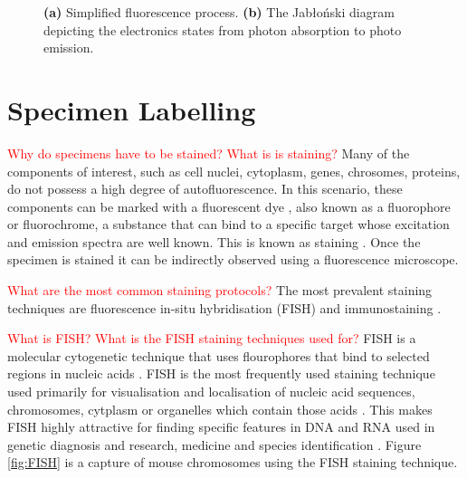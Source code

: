 \begin{figure}[!h]
	\centering
	\caption{\textbf{(a)} Simplified fluorescence process. \textbf{(b)} The Jab{\l}o{\'n}ski diagram depicting the electronics states from photon absorption to photo emission.}
	\label{fig:thinkoflabel}
\end{figure}


\section{Specimen Labelling}
\label{sec:SpecimenLabelling}

\textcolor{red}{Why do specimens have to be stained? What is is staining?}
Many of the components of interest, such as cell nuclei, cytoplasm, genes, chrosomes, proteins, do not possess a high degree of autofluorescence. 
In this scenario, these components can be marked with a fluorescent dye \citep{Tsien1998}, also known as a fluorophore or fluorochrome, a substance that can bind to a specific target whose excitation and emission spectra are well known. 
This is known as staining \citep{Danek2012,Hubeny2008,Dobrucki2013}. 
Once the specimen is stained it can be indirectly observed using a fluorescence microscope.

\textcolor{red}{What are the most common staining protocols?}
The most prevalent staining techniques are fluorescence in-situ hybridisation (FISH) and immunostaining \citep{Danek2012,Fatima2008,Kozubek2001_2,Theodosiou2007}.

\begin{definition}
	\textcolor{red}{What is FISH?	What is the FISH staining techniques used for?}
	FISH is a molecular cytogenetic technique that uses flourophores that bind to selected regions in nucleic acids \citep{Danek2012,Fatima2008}.
	FISH is the most frequently used staining technique used primarily for visualisation and localisation of nucleic acid sequences, chromosomes, cytplasm or organelles which contain those acids \citep{Hubeny2008}.
	This makes FISH highly attractive for finding specific features in DNA and RNA used in genetic diagnosis and research, medicine and species identification \citep{Amann2008,Fatima2008}.
	Figure \ref{fig:FISH} is a capture of mouse chromosomes using the FISH staining technique.
\end{definition}

